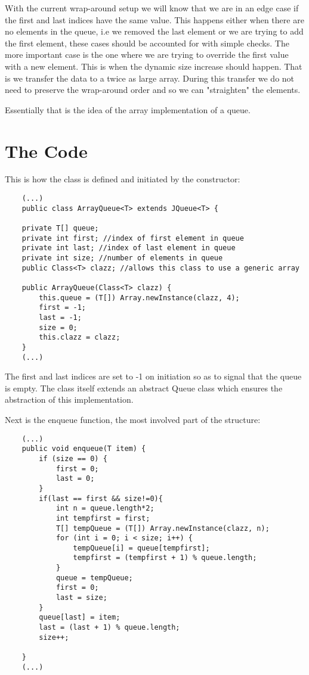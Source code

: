 \documentclass[a4paper,11pt]{article}
\begin{document}
With the current wrap-around setup we will know that we are in an edge case if the first and last indices have the same value. This happens either when there are no elements in the queue, i.e we removed the last element or we are trying to add the first element, these cases should be accounted for with simple checks. The more important case is the one where we are trying to override the first value with a new element. This is when the dynamic size increase should happen. That is we transfer the data to a twice as large array. During this transfer we do not need to preserve the wrap-around order and so we can "straighten" the elements.

Essentially that is the idea of the array implementation of a queue.

\section*{The Code}

This is how the class is defined and initiated by the constructor: 

\begin{verbatim}
    (...)
    public class ArrayQueue<T> extends JQueue<T> {

    private T[] queue;
    private int first; //index of first element in queue
    private int last; //index of last element in queue
    private int size; //number of elements in queue
    public Class<T> clazz; //allows this class to use a generic array

    public ArrayQueue(Class<T> clazz) {
        this.queue = (T[]) Array.newInstance(clazz, 4);
        first = -1;
        last = -1;
        size = 0;
        this.clazz = clazz;
    }
    (...)
\end{verbatim}

The first and last indices are set to -1 on initiation so as to signal that the queue is empty. The class itself extends an abstract Queue class which ensures the abstraction of this implementation.

Next is the enqueue function, the most involved part of the structure:

\begin{verbatim}
    (...)
    public void enqueue(T item) {
        if (size == 0) {
            first = 0;
            last = 0;
        }
        if(last == first && size!=0){
            int n = queue.length*2;
            int tempfirst = first;
            T[] tempQueue = (T[]) Array.newInstance(clazz, n);
            for (int i = 0; i < size; i++) {
                tempQueue[i] = queue[tempfirst];
                tempfirst = (tempfirst + 1) % queue.length;
            }
            queue = tempQueue;
            first = 0;
            last = size;
        }
        queue[last] = item;
        last = (last + 1) % queue.length;
        size++;

    }
    (...)
\end{verbatim}
\end{document}
